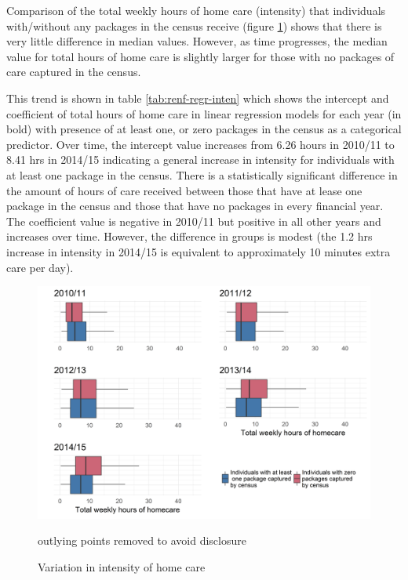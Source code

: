 \documentclass[]{article}
\begin{document}
Comparison of the total weekly hours of home care (intensity) that
individuals with/without any packages in the census receive (figure
\ref{fig:renf-inten}) shows that there is very little difference in
median values. However, as time progresses, the median value for total
hours of home care is slightly larger for those with no packages of care
captured in the census.

This trend is shown in table \ref{tab:renf-regr-inten} which shows the
intercept and coefficient of total hours of home care in linear
regression models for each year (in bold) with presence of at least one,
or zero packages in the census as a categorical predictor. Over time,
the intercept value increases from 6.26 hours in 2010/11 to 8.41 hrs in
2014/15 indicating a general increase in intensity for individuals with
at least one package in the census. There is a statistically significant
difference in the amount of hours of care received between those that
have at lease one package in the census and those that have no packages
in every financial year. The coefficient value is negative in 2010/11
but positive in all other years and increases over time. However, the
difference in groups is modest (the 1.2 hrs increase in intensity in
2014/15 is equivalent to approximately 10 minutes extra care per day).

\begin{figure}[h]
  \centering
    \includegraphics{figures/chapter-renf/14-inten.png}
    \caption{Variation in intensity of home care}
    {\scriptsize outlying points removed to avoid disclosure}
    \label{fig:renf-inten}
\end{figure}
\end{document}
